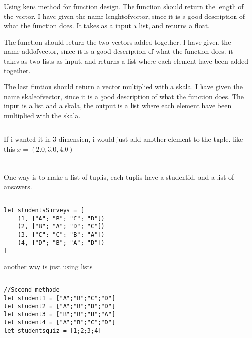 \documentclass{article}
\begin{document}
Using kens method for function design. The function should return the length of the vector. I have given the name lenghtofvector, since it is a good description of what the function does. It takes as a input a list, and returns a float. 

The function should return the two vectors added together. I have given the name addofvector, since it is a good description of what the function does. it takes as two lists as input, and returns a list where each element have been added together. 

The last funtion should return a vector multiplied with a skala. I have given the name skaleofvector, since it is a good description of what the function does. The input is a list and a skala, the output is a list where each element have been multiplied with the skala. 

\subsection{}

If i wanted it in 3 dimension, i would just add another element to the tuple. like this
$x = (2.0, 3.0, 4.0)$




\section{}

\subsection{}
One way is to make a list of tuplis, each tuplis have a studentid, and a list of ansawers.

    \begin{lstlisting}

let studentsSurveys = [
    (1, ["A"; "B"; "C"; "D"])
    (2, ["B"; "A"; "D"; "C"])
    (3, ["C"; "C"; "B"; "A"])
    (4, ["D"; "B"; "A"; "D"])
]

    \end{lstlisting}


another way is just using lists


    \begin{lstlisting}

//Second methode
let student1 = ["A";"B";"C";"D"]
let student2 = ["A";"B";"D";"D"]
let student3 = ["B";"B";"B";"A"]
let student4 = ["A";"B";"C";"D"]
let studentsquiz = [1;2;3;4]

    \end{lstlisting}
\end{document}
